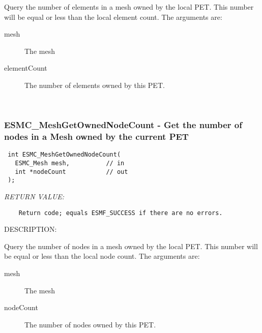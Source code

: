    Query the number of elements in a mesh owned by the local PET. This number will be equal or less than the
   local element count.
   The arguments are:
   \begin{description}
   \item[mesh]
       The mesh
   \item[elementCount]
       The number of elements owned by this PET.
   \end{description}
   
 
\mbox{}\hrulefill\ 
 
\subsubsection [ESMC\_MeshGetOwnedNodeCount] {ESMC\_MeshGetOwnedNodeCount - Get the number of nodes in a Mesh owned by the current PET}


  
\begin{verbatim} int ESMC_MeshGetOwnedNodeCount(
   ESMC_Mesh mesh,          // in
   int *nodeCount           // out
 );
 \end{verbatim}{\em RETURN VALUE:}
\begin{verbatim}    Return code; equals ESMF_SUCCESS if there are no errors.\end{verbatim}
{\sf DESCRIPTION:\\ }


   Query the number of nodes in a mesh owned by the local PET.  This number will be equal or less than the
   local node count.
   The arguments are:
   \begin{description}
   \item[mesh]
       The mesh
   \item[nodeCount]
       The number of nodes owned by this PET.
   \end{description}
  
\setlength{\parskip}{\oldparskip}
\setlength{\parindent}{\oldparindent}
\setlength{\baselineskip}{\oldbaselineskip}
